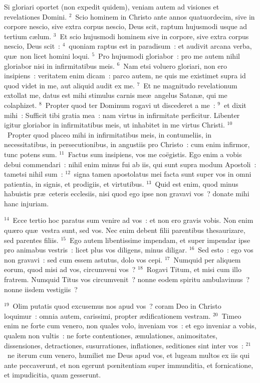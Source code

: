 \lettrine[lines=3,image=true,loversize=0.05,lraise=-0.03]{S}{}i gloriari oportet (non expedit quidem), veniam autem ad visiones et revelationes Domini.
${}^{2}$~Scio hominem in Christo ante annos quatuordecim, sive in corpore nescio, sive extra corpus nescio, Deus scit, raptum hujusmodi usque ad tertium c\ae lum.
${}^{3}$~Et scio hujusmodi hominem sive in corpore, sive extra corpus nescio, Deus scit~:
${}^{4}$~quoniam raptus est in paradisum~: et audivit arcana verba, qu\ae\ non licet homini loqui.
${}^{5}$~Pro hujusmodi gloriabor~: pro me autem nihil gloriabor nisi in infirmitatibus meis.
${}^{6}$~Nam etsi voluero gloriari, non ero insipiens~: veritatem enim dicam~: parco autem, ne quis me existimet supra id quod videt in me, aut aliquid audit ex me.
${}^{7}$~Et ne magnitudo revelationum extollat me, datus est mihi stimulus carnis me\ae\ angelus Satan\ae , qui me colaphizet.
${}^{8}$~Propter quod ter Dominum rogavi ut discederet a me~:
${}^{9}$~et dixit mihi~: Sufficit tibi gratia mea~: nam virtus in infirmitate perficitur. Libenter igitur gloriabor in infirmitatibus meis, ut inhabitet in me virtus Christi.
${}^{10}$~Propter quod placeo mihi in infirmitatibus meis, in contumeliis, in necessitatibus, in persecutionibus, in angustiis pro Christo~: cum enim infirmor, tunc potens sum.
${}^{11}$~Factus sum insipiens, vos me co\"egistis. Ego enim a vobis debui commendari~: nihil enim minus fui ab iis, qui sunt supra modum Apostoli~: tametsi nihil sum~:
${}^{12}$~signa tamen apostolatus mei facta sunt super vos in omni patientia, in signis, et prodigiis, et virtutibus.
${}^{13}$~Quid est enim, quod minus habuistis pr\ae\ ceteris ecclesiis, nisi quod ego ipse non gravavi vos~? donate mihi hanc injuriam.


${}^{14}$~Ecce tertio hoc paratus sum venire ad vos~: et non ero gravis vobis. Non enim qu\ae ro qu\ae\ vestra sunt, sed vos. Nec enim debent filii parentibus thesaurizare, sed parentes filiis.
${}^{15}$~Ego autem libentissime impendam, et super impendar ipse pro animabus vestris~: licet plus vos diligens, minus diligar.
${}^{16}$~Sed esto~: ego vos non gravavi~: sed cum essem astutus, dolo vos cepi.
${}^{17}$~Numquid per aliquem eorum, quod misi ad vos, circumveni vos~?
${}^{18}$~Rogavi Titum, et misi cum illo fratrem. Numquid Titus vos circumvenit~? nonne eodem spiritu ambulavimus~? nonne iisdem vestigiis~?


${}^{19}$~Olim putatis quod excusemus nos apud vos~? coram Deo in Christo loquimur~: omnia autem, carissimi, propter \ae dificationem vestram.
${}^{20}$~Timeo enim ne forte cum venero, non quales volo, inveniam vos~: et ego inveniar a vobis, qualem non vultis~: ne forte contentiones, \ae mulationes, animositates, dissensiones, detractiones, susurrationes, inflationes, seditiones sint inter vos~:
${}^{21}$~ne iterum cum venero, humiliet me Deus apud vos, et lugeam multos ex iis qui ante peccaverunt, et non egerunt pœnitentiam super immunditia, et fornicatione, et impudicitia, quam gesserunt.

